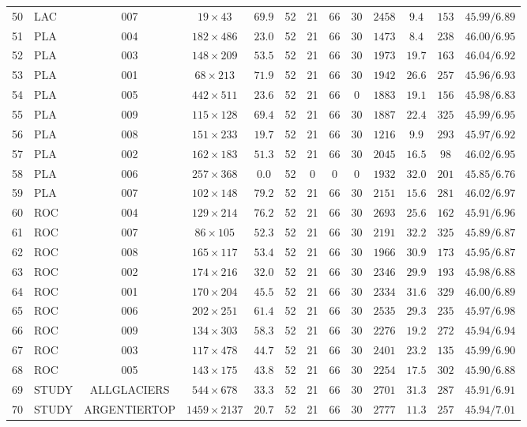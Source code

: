 \begin{table}[H]
{\begin{NiceTabular}{llccccccccccc}
50 & LAC & 007 & $19 \times 43$ & $69.9$ & 52 & 21 & 66 & 30 & $2458$ & $9.4$ & $153$ & $45.99/6.89$ \\
51 & PLA & 004 & $182 \times 486$ & $23.0$ & 52 & 21 & 66 & 30 & $1473$ & $8.4$ & $238$ & $46.00/6.95$ \\
52 & PLA & 003 & $148 \times 209$ & $53.5$ & 52 & 21 & 66 & 30 & $1973$ & $19.7$ & $163$ & $46.04/6.92$ \\
53 & PLA & 001 & $68 \times 213$ & $71.9$ & 52 & 21 & 66 & 30 & $1942$ & $26.6$ & $257$ & $45.96/6.93$ \\
54 & PLA & 005 & $442 \times 511$ & $23.6$ & 52 & 21 & 66 & 0 & $1883$ & $19.1$ & $156$ & $45.98/6.83$ \\
55 & PLA & 009 & $115 \times 128$ & $69.4$ & 52 & 21 & 66 & 30 & $1887$ & $22.4$ & $325$ & $45.99/6.95$ \\
56 & PLA & 008 & $151 \times 233$ & $19.7$ & 52 & 21 & 66 & 30 & $1216$ & $9.9$ & $293$ & $45.97/6.92$ \\
57 & PLA & 002 & $162 \times 183$ & $51.3$ & 52 & 21 & 66 & 30 & $2045$ & $16.5$ & $98$ & $46.02/6.95$ \\
58 & PLA & 006 & $257 \times 368$ & $0.0$ & 52 & 0 & 0 & 0 & $1932$ & $32.0$ & $201$ & $45.85/6.76$ \\
59 & PLA & 007 & $102 \times 148$ & $79.2$ & 52 & 21 & 66 & 30 & $2151$ & $15.6$ & $281$ & $46.02/6.97$ \\
60 & ROC & 004 & $129 \times 214$ & $76.2$ & 52 & 21 & 66 & 30 & $2693$ & $25.6$ & $162$ & $45.91/6.96$ \\
61 & ROC & 007 & $86 \times 105$ & $52.3$ & 52 & 21 & 66 & 30 & $2191$ & $32.2$ & $325$ & $45.89/6.87$ \\
62 & ROC & 008 & $165 \times 117$ & $53.4$ & 52 & 21 & 66 & 30 & $1966$ & $30.9$ & $173$ & $45.95/6.87$ \\
63 & ROC & 002 & $174 \times 216$ & $32.0$ & 52 & 21 & 66 & 30 & $2346$ & $29.9$ & $193$ & $45.98/6.88$ \\
64 & ROC & 001 & $170 \times 204$ & $45.5$ & 52 & 21 & 66 & 30 & $2334$ & $31.6$ & $329$ & $46.00/6.89$ \\
65 & ROC & 006 & $202 \times 251$ & $61.4$ & 52 & 21 & 66 & 30 & $2535$ & $29.3$ & $235$ & $45.97/6.98$ \\
66 & ROC & 009 & $134 \times 303$ & $58.3$ & 52 & 21 & 66 & 30 & $2276$ & $19.2$ & $272$ & $45.94/6.94$ \\
67 & ROC & 003 & $117 \times 478$ & $44.7$ & 52 & 21 & 66 & 30 & $2401$ & $23.2$ & $135$ & $45.99/6.90$ \\
68 & ROC & 005 & $143 \times 175$ & $43.8$ & 52 & 21 & 66 & 30 & $2254$ & $17.5$ & $302$ & $45.90/6.88$ \\
69 & STUDY & ALLGLACIERS & $544 \times 678$ & $33.3$ & 52 & 21 & 66 & 30 & $2701$ & $31.3$ & $287$ & $45.91/6.91$ \\
70 & STUDY & ARGENTIERTOP & $1459 \times 2137$ & $20.7$ & 52 & 21 & 66 & 30 & $2777$ & $11.3$ & $257$ & $45.94/7.01$ \\

\bottomrule
\end{NiceTabular}%
}
\end{table}
